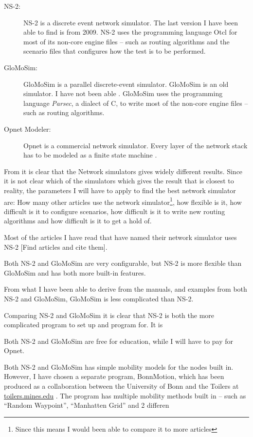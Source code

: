 \documentclass[letter, 12pt, english, draft]{article}
\begin{document}
\begin{description}
\item[NS-2:] NS-2 is a discrete event network simulator. The last version I have been able to find is from 2009. NS-2 uses the programming language Otcl for most of its non-core engine files -- such as routing algorithms and the scenario files that configures how the test is to be performed.
\item[GloMoSim:] GloMoSim is a parallel discrete-event simulator. GloMoSim is an old simulator. I have not been able   . GloMoSim uses the programming language \emph{Parsec}, a dialect of C, to write most of the non-core engine files -- such as routing algorithms. 
\item[Opnet Modeler:] Opnet is a commercial network simulator. Every layer of the network stack has to be modeled as a finite state machine \cite{MANcom}.
\end{description}

From \cite{MANcom}  it is clear that the Network simulators gives widely different results. Since it is not clear which of the simulators which gives the result that is closest to reality, the parameters I will have to apply to find the best network simulator are: How many other articles use the network simulator\footnote{Since this means I would been able to compare it to more articles}, how flexible is it, how difficult is it to configure scenarios, how difficult is it to write new routing algorithms and how difficult is it to get a hold of.

Most of the articles I have read that have named their network simulator uses NS-2 [Find articles and cite them].

Both NS-2 and GloMoSim are very configurable, but NS-2 is more flexible than GloMoSim and has both more built-in features.

From what I have been able to derive from the manuals, and examples from both NS-2 and GloMoSim, GloMoSim is less complicated than NS-2.

Comparing NS-2 and GloMoSim it is clear that NS-2 is both the more complicated program to set up and program for. It is 

Both NS-2 and GloMoSim are free for education, while I will have to pay for Opnet.

Both NS-2 and GloMoSim has simple mobility models for the nodes built in. However, I have chosen a separate program, BonnMotion, which has been produced as a collaboration between the University of Bonn and the Toilers at \url{toilers.mines.edu} . The program has multiple mobility methods built in -- such as ``Random Waypoint'', ``Manhatten Grid'' and 2 differen



{}
\end{document}
